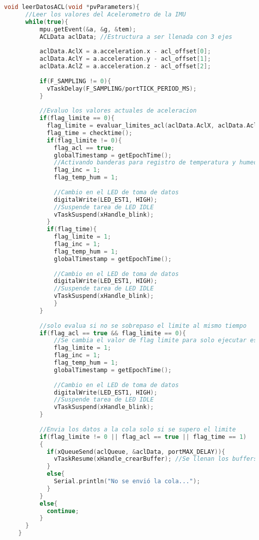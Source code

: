 \begin{lstlisting}[language=C++, caption=Creación de tareas en FreeRTOS]
  void leerDatosACL(void *pvParameters){
      //Leer los valores del Acelerometro de la IMU
      while(true){
          mpu.getEvent(&a, &g, &tem);
          ACLData aclData; //Estructura a ser llenada con 3 ejes
    
          aclData.AclX = a.acceleration.x - acl_offset[0];
          aclData.AclY = a.acceleration.y - acl_offset[1]; 
          aclData.AclZ = a.acceleration.z - acl_offset[2];
    
          if(F_SAMPLING != 0){
            vTaskDelay(F_SAMPLING/portTICK_PERIOD_MS);
          }
          
          //Evaluo los valores actuales de aceleracion
          if(flag_limite == 0){
            flag_limite = evaluar_limites_acl(aclData.AclX, aclData.AclY, aclData.AclZ);
            flag_time = checktime();
            if(flag_limite != 0){
              flag_acl == true;
              globalTimestamp = getEpochTime();
              //Activando banderas para registro de temperatura y humedad
              flag_inc = 1;
              flag_temp_hum = 1;
    
              //Cambio en el LED de toma de datos
              digitalWrite(LED_EST1, HIGH);
              //Suspende tarea de LED IDLE
              vTaskSuspend(xHandle_blink);
            }
            if(flag_time){
              flag_limite = 1;
              flag_inc = 1;
              flag_temp_hum = 1;
              globalTimestamp = getEpochTime();
    
              //Cambio en el LED de toma de datos
              digitalWrite(LED_EST1, HIGH);
              //Suspende tarea de LED IDLE
              vTaskSuspend(xHandle_blink);
              }
          }
    
          //solo evalua si no se sobrepaso el limite al mismo tiempo
          if(flag_acl == true && flag_limite == 0){
              //Se cambia el valor de flag limite para solo ejecutar esto 1 vez
              flag_limite = 1;
              flag_inc = 1;
              flag_temp_hum = 1;
              globalTimestamp = getEpochTime();
    
              //Cambio en el LED de toma de datos
              digitalWrite(LED_EST1, HIGH);
              //Suspende tarea de LED IDLE
              vTaskSuspend(xHandle_blink);
          }
    
          //Envia los datos a la cola solo si se supero el limite
          if(flag_limite != 0 || flag_acl == true || flag_time == 1)
          {
            if(xQueueSend(aclQueue, &aclData, portMAX_DELAY)){
              vTaskResume(xHandle_crearBuffer); //Se llenan los buffers para enviar los datos
            }
            else{
              Serial.println("No se envió la cola...");
            }
          }
          else{
            continue;
          }
      }
    }
    
\end{lstlisting}

